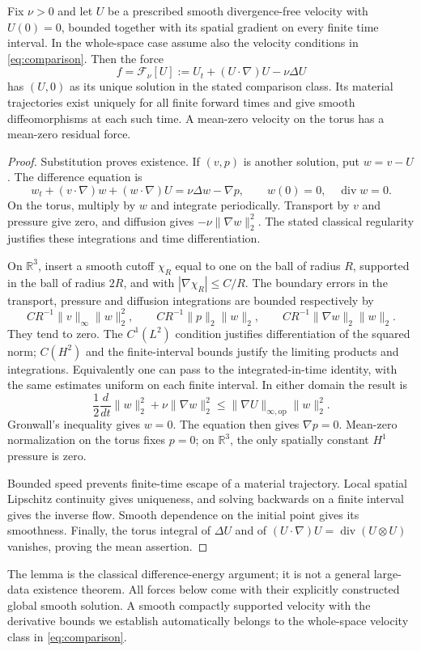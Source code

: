 \begin{lemma}\label{lem:b-comparison}
Fix $\nu>0$ and let $U$ be a prescribed smooth divergence-free velocity with $U(0)=0$, bounded together with its spatial gradient on every finite time interval. In the whole-space case assume also the velocity conditions in \eqref{eq:comparison}. Then the force
\[
 f=\mathcal F_\nu[U]:=U_t+(U\cdot\nabla)U-\nu\Delta U
\]
has $(U,0)$ as its unique solution in the stated comparison class. Its material trajectories exist uniquely for all finite forward times and give smooth diffeomorphisms at each such time. A mean-zero velocity on the torus has a mean-zero residual force.
\end{lemma}
\begin{proof}
Substitution proves existence. If $(v,p)$ is another solution, put $w=v-U$. The difference equation is
\[
 w_t+(v\cdot\nabla)w+(w\cdot\nabla)U
       =\nu\Delta w-\nabla p,\qquad w(0)=0,\quad\operatorname{div}w=0.
\]
On the torus, multiply by $w$ and integrate periodically. Transport by $v$ and pressure give zero, and diffusion gives $-\nu\|\nabla w\|_2^2$. The stated classical regularity justifies these integrations and time differentiation.

On $\mathbb R^3$, insert a smooth cutoff $\chi_R$ equal to one on the ball of radius $R$, supported in the ball of radius $2R$, and with $|\nabla\chi_R|\le C/R$. The boundary errors in the transport, pressure and diffusion integrations are bounded respectively by
\[
 CR^{-1}\|v\|_\infty\|w\|_2^2,\qquad
 CR^{-1}\|p\|_2\|w\|_2,\qquad
 CR^{-1}\|\nabla w\|_2\|w\|_2.
\]
They tend to zero. The $C^1(L^2)$ condition justifies differentiation of the squared norm; $C(H^2)$ and the finite-interval bounds justify the limiting products and integrations. Equivalently one can pass to the integrated-in-time identity, with the same estimates uniform on each finite interval. In either domain the result is
\[
 \frac12\frac{d}{dt}\|w\|_2^2+\nu\|\nabla w\|_2^2
 \le\|\nabla U\|_{\infty,\mathrm{op}}\|w\|_2^2.
\]
Gronwall's inequality gives $w=0$. The equation then gives $\nabla p=0$. Mean-zero normalization on the torus fixes $p=0$; on $\mathbb R^3$, the only spatially constant $H^1$ pressure is zero.

Bounded speed prevents finite-time escape of a material trajectory. Local spatial Lipschitz continuity gives uniqueness, and solving backwards on a finite interval gives the inverse flow. Smooth dependence on the initial point gives its smoothness. Finally, the torus integral of $\Delta U$ and of $(U\cdot\nabla)U=\operatorname{div}(U\otimes U)$ vanishes, proving the mean assertion.
\end{proof}

The lemma is the classical difference-energy argument; it is not a general large-data existence theorem. All forces below come with their explicitly constructed global smooth solution. A smooth compactly supported velocity with the derivative bounds we establish automatically belongs to the whole-space velocity class in \eqref{eq:comparison}.
